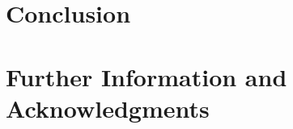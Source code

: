 \documentclass[10pt, conference, compsocconf]{IEEEtran}
\begin{document}
\section{Conclusion}\label{s:conclusion}
\section*{Further Information and Acknowledgments}


%

\end{document}
